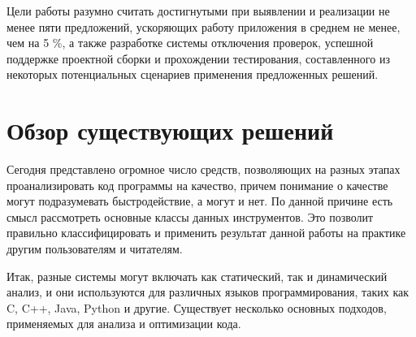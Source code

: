 \documentclass{mipt-thesis-bs}
\begin{document}
Цели работы разумно считать достигнутыми при выявлении и реализации не менее пяти предложений, ускоряющих работу приложения в среднем не менее, чем на 5 \%, 
а также разработке системы отключения проверок, успешной поддержке проектной сборки и прохождении тестирования, составленного из некоторых 
потенциальных сценариев применения предложенных решений.

\chapter{Обзор существующих решений}
Сегодня представлено огромное число средств, позволяющих на разных этапах проанализировать код программы на качество,
причем понимание о качестве могут подразумевать быстродействие, а могут и нет. По данной причине есть смысл
рассмотреть основные классы данных инструментов. Это позволит правильно классифицировать и применить результат данной
работы на практике другим пользователям и читателям.

Итак, разные системы могут включать как статический, так и динамический анализ, и они
используются для различных языков программирования, таких как C, C++, Java, Python и другие.
Существует несколько основных подходов, применяемых для анализа и оптимизации кода.
\end{document}
